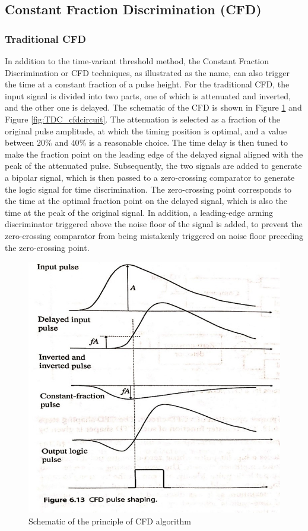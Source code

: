 \subsection{Constant Fraction Discrimination (CFD)}
\subsubsection{ Traditional CFD}
In addition to the time-variant threshold method, the Constant Fraction Discrimination or CFD techniques, as illustrated as the name, can also trigger the time at a constant fraction of a pulse height. For the traditional CFD, the input signal is divided into two parts, one of which is attenuated and inverted, and the other one is delayed. The schematic of the CFD is shown in Figure \ref{fig:TDC_cfd} and Figure \ref{fig:TDC_cfdcircuit}. The attenuation is selected as a fraction of the original pulse amplitude, at which the timing position is optimal, and a value between $20\%$ and $40\%$ is a reasonable choice. The time delay is then tuned to make the fraction point on the leading edge of the delayed signal aligned with the peak of the attenuated pulse. Subsequently, the two signals are added to generate a bipolar signal, which is then passed to a zero-crossing comparator to generate the logic signal for time discrimination. The zero-crossing point corresponds to the time at the optimal fraction point on the delayed signal, which is also the time at the peak of the original signal. In addition, a leading-edge arming discriminator triggered above the noise floor of the signal is added, to prevent the zero-crossing comparator from being mistakenly triggered on noise floor preceding the zero-crossing point.\par
\begin{figure}[t!p]
\centering
\includegraphics[width=.8\textwidth]{figures/chapter3_TDC/cfd.jpg}
\caption{Schematic of the principle of CFD algorithm}
\label{fig:TDC_cfd}
\end{figure}
